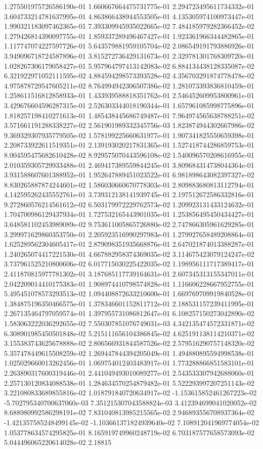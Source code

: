 1.275501975726586190e-01	1.660667664475731775e-01	2.294723495611734332e-01	3.604733214781637995e-01	4.863866438944553505e-01	4.135305974100973447e-01	1.990321183097462365e-01	7.393309945935022665e-02	7.484185979282366452e-02	1.279426814390097755e-01	1.859337289496467427e-01	1.923361966344482865e-01	1.117747074227597726e-01	5.643579881959105704e-02	2.086549191793886926e-01	3.949096718724587896e-01	3.815272736429131673e-01	2.329781301768309720e-01	1.028267306179058427e-01	5.957964797413142083e-02	6.884134438128335087e-02	6.321922971052111595e-02	4.884594298573393528e-02	4.356703291874778478e-02	4.975878729547605211e-02	8.764994942306507386e-02	1.281073393836810459e-01	1.258611516812858933e-01	1.433939588818351762e-01	2.546452609953800961e-01	3.429676604596287315e-01	2.526303344018190344e-01	1.657961085998775896e-01	1.818257198410271613e-01	1.485438445686749487e-01	7.964974565638788251e-02	3.571661191288338227e-02	2.561901989332345756e-03	1.823874944302667986e-02	9.369329307935779505e-02	1.578199225660631977e-01	1.907341825550659398e-01	2.208733922611519351e-01	2.139193020217831365e-01	1.527418744286859753e-01	8.004595475682610428e-02	8.929575070443596108e-02	1.540096570208616955e-01	2.010359305729933488e-01	2.469417389559844245e-01	3.809684314738044364e-01	3.931588607601388952e-01	1.952647889451023522e-01	6.981898643082397327e-02	8.830265887874244601e-02	1.586030660670778303e-01	2.809883680813112794e-01	4.142595262435552761e-01	3.739312138141939745e-01	2.197512672586332816e-01	9.272860576214561612e-02	6.503179972229762573e-02	1.209923131433124632e-01	1.704700986129437934e-01	1.727532165443901035e-01	1.253856495450434427e-01	3.648581102453989089e-02	9.753611005865726880e-02	2.747866305961629285e-01	3.299971629860353750e-01	2.205923516990297983e-01	1.279927658489208864e-01	1.625289562304605417e-01	2.879098351935668876e-01	2.647021874013388287e-01	1.240265074417221530e-01	4.667882958374369035e-02	3.114675423079124247e-02	3.737961525210800606e-02	6.017715030225422035e-02	1.198956111717389417e-01	2.411870815977781302e-01	3.187685117739164631e-01	2.607345313155347011e-01	2.042209014410175383e-01	1.908974410798574828e-01	1.116606228667952755e-01	5.495451078573293513e-02	1.094408872633210600e-01	1.669769709919840528e-01	1.384875196350466575e-01	1.378346601152811712e-01	2.188531157239411995e-01	2.267135464797059574e-01	1.397955731086812647e-01	6.108257150273042890e-02	1.583063222036292655e-02	7.550307851076749031e-03	4.342135474572331871e-02	6.308901985450501848e-02	5.215111656104386845e-02	4.625191138114210371e-02	3.155383743625678888e-02	2.806566931844587526e-02	2.579516290757148320e-02	5.357478449615508259e-02	1.269447844394205049e-01	1.494880895594998538e-01	1.025029660013262456e-01	1.069754012403483917e-01	1.773288866851583101e-01	2.263890317600319446e-01	2.441049493010089277e-01	2.543533307942688060e-01	2.257130120834088538e-01	1.284634570254879482e-01	5.522293997207251143e-02	3.221080833689855816e-02	1.018791840720634917e-02	-1.153615852461267223e-02	-5.702795340700637060e-03	7.351215307043588824e-03	3.412394699041020052e-02	8.688980992586298191e-02	7.831040813985215565e-02	2.946893556708937364e-02	-1.421357585248499145e-02	-1.103661371824939640e-02	7.108912041969774054e-02	1.053778634574295825e-01	8.165919749960248719e-02	6.703187577658573093e-02	5.044496065220614028e-02	2.18815